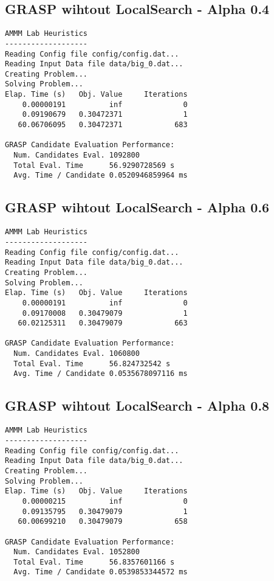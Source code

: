 \documentclass{article}
\begin{document}
\subsection{GRASP wihtout LocalSearch - Alpha 0.4}
\begin{lstlisting}
AMMM Lab Heuristics
-------------------
Reading Config file config/config.dat...
Reading Input Data file data/big_0.dat...
Creating Problem...
Solving Problem...
Elap. Time (s)   Obj. Value     Iterations
    0.00000191          inf              0
    0.09190679   0.30472371              1
   60.06706095   0.30472371            683

GRASP Candidate Evaluation Performance:
  Num. Candidates Eval. 1092800
  Total Eval. Time      56.9290728569 s
  Avg. Time / Candidate 0.0520946859964 ms
\end{lstlisting}

\subsection{GRASP wihtout LocalSearch - Alpha 0.6}
\begin{lstlisting}
AMMM Lab Heuristics
-------------------
Reading Config file config/config.dat...
Reading Input Data file data/big_0.dat...
Creating Problem...
Solving Problem...
Elap. Time (s)   Obj. Value     Iterations
    0.00000191          inf              0
    0.09170008   0.30479079              1
   60.02125311   0.30479079            663

GRASP Candidate Evaluation Performance:
  Num. Candidates Eval. 1060800
  Total Eval. Time      56.824732542 s
  Avg. Time / Candidate 0.0535678097116 ms
\end{lstlisting}

\subsection{GRASP wihtout LocalSearch - Alpha 0.8}
\begin{lstlisting}
AMMM Lab Heuristics
-------------------
Reading Config file config/config.dat...
Reading Input Data file data/big_0.dat...
Creating Problem...
Solving Problem...
Elap. Time (s)   Obj. Value     Iterations
    0.00000215          inf              0
    0.09135795   0.30479079              1
   60.00699210   0.30479079            658

GRASP Candidate Evaluation Performance:
  Num. Candidates Eval. 1052800
  Total Eval. Time      56.8357601166 s
  Avg. Time / Candidate 0.0539853344572 ms
\end{lstlisting}
\end{document}
